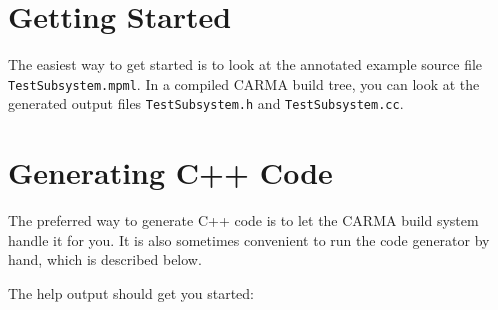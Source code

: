 \documentclass[letterpaper,12pt,oneside,pdftex]{article}
\title{\mytitle}
\author{\myname\\\emaillink{\myemail}}
\date{\today}
\newcommand{\shadebox}[1]{\fcolorbox{black}{shade}{\begin{minipage}{\textwidth}#1\end{minipage}}}
\begin{document}
\sffamily

\maketitle

\begin{abstract}
The Monitor Point Markup Language (MPML) is a set of XML tags used to define
monitor point hierarchies.It functionally serves two purposes: to provide data
for configuring the monitor point database and to configure automatically
generated classes interacting with a hierarchy in software. As the single point
of input for both purposes, it also serves as documentation for monitor point
data. This document describes how to use the MPML tags to define a hierarchy and
generate C++ classes for interacting with it. 
\end{abstract}

\tableofcontents

\section{Getting Started}

The easiest way to get started is to look at the annotated example source file
\texttt{TestSubsystem.mpml}. In a compiled CARMA build tree, you can look at the
generated output files \texttt{TestSubsystem.h} and \texttt{TestSubsystem.cc}.

\section{Generating C++ Code}

The preferred way to generate C++ code is to let the CARMA build system handle
it for you. It is also sometimes convenient to run the code generator by hand,
which is described below.

The help output should get you started:

\shadebox{\theverbbox}
\end{document}
